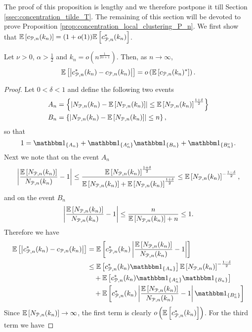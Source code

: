 The proof of this proposition is lengthy and we therefore postpone it till Section \ref{ssec:concentration_tilde_T}. The remaining of this section will be devoted to prove Proposition \ref{prop:concentration_local_clustering_P_n}. We first show that $\mathbb{E}\left[c_{{\mathcal P},n}(k_n)\right] = (1+o(1))\mathbb{E}\left[c^\ast_{{\mathcal P},n}(k_n)\right]$.

\begin{lemma}\label{lem:L1_convergence_c_Pcal_n}
Let $\nu > 0$, $\alpha > \frac{1}{2}$ and $k_n = o\left(n^{\frac{1}{2\alpha + 1}}\right)$. Then, as $n \to \infty$,
\[
	\mathbb{E}\left[\left|c_{{\mathcal P}, n}^\ast(k_n) - c_{{\mathcal P}, n}(k_n)\right|\right] = o\left(\mathbb{E}\left[c_{{\mathcal P},n}(k_n)^\ast\right]\right).
\]
\end{lemma}

\begin{proof}
Let $0 < \delta < 1$ and define the following two events
\begin{align*}
	A_n &= \left\{\left|N_{{\mathcal P},n}(k_n) - \mathbb{E}\left[N_{{\mathcal P},n}(k_n)\right]\right| \le \mathbb{E}\left[N_{{\mathcal P},n}(k_n)\right]^{\frac{1 + \delta}{2}}\right\}\\
	B_n &= \left\{\left|N_{{\mathcal P},n}(k_n) - \mathbb{E}\left[N_{{\mathcal P},n}(k_n)\right]\right| \le n\right\},
\end{align*}
so that
\[
	1 = \ind{A_n} + \ind{A_n^c}\ind{B_n} + \ind{B_n^c}.
\]
Next we note that on the event $A_n$
\[
	\left|\frac{\mathbb{E}\left[N_{{\mathcal P},n}(k_n)\right]}{N_{{\mathcal P},n}(k_n)} - 1\right| 
	\le \frac{\mathbb{E}\left[N_{{\mathcal P},n}(k_n)\right]^{\frac{1 + \delta}{2}}}{\mathbb{E}\left[N_{{\mathcal P},n}(k_n)\right]+\mathbb{E}\left[N_{{\mathcal P},n}(k_n)\right]^{\frac{1 + \delta}{2}}}
	\le \mathbb{E}\left[N_{{\mathcal P},n}(k_n)\right]^{-\frac{1 - \delta}{2}},
\]
and on the event $B_n$
\[
	\left|\frac{\mathbb{E}\left[N_{{\mathcal P},n}(k_n)\right]}{N_{{\mathcal P},n}(k_n)} - 1\right| 
	\le \frac{n}{\mathbb{E}\left[N_{{\mathcal P},n}(k_n)\right] + n} \le 1.
\]
Therefore we have
\begin{align*}
	\Exp{\left|c_{\Pcal, n}^\ast(k_n) - c_{\Pcal, n}(k_n)\right|}
	&= \Exp{c_{\Pcal, n}^\ast(k_n)\left|\frac{\Exp{N_{\Pcal,n}(k_n)}}{N_{\Pcal,n}(k_n)} - 1\right|}\\
	&\le \Exp{c_{\Pcal, n}^\ast(k_n)\ind{A_n}}\Exp{N_{\Pcal,n}(k_n)}^{-\frac{1 - \delta}{2}} \\
	&\hspace{10pt}+ \Exp{c_{\Pcal, n}^\ast(k_n)\ind{A_n^c}\ind{B_n}} \\
	&\hspace{10pt}+ \Exp{c_{\Pcal, n}^\ast(k_n)\left|\frac{\Exp{N_{\Pcal,n}(k_n)}}{N_{\Pcal,n}(k_n)} - 1\right|\ind{B_n^c}}
\end{align*}
Since $\mathbb{E}\left[N_{{\mathcal P},n}(k_n)\right] \to \infty$, the first term is clearly $o\left(\mathbb{E}\left[c_{{\mathcal P}, n}^\ast(k_n)\right]\right)$. For the third term we have

\end{proof}
